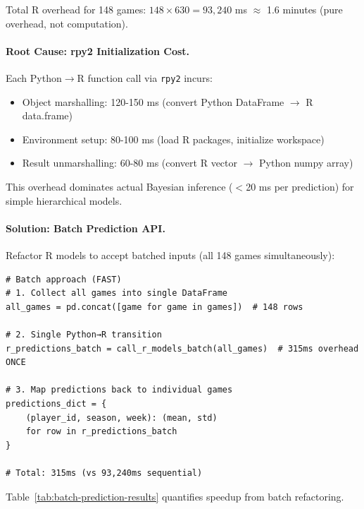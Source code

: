 Total R overhead for 148 games: $148 \times 630 = 93,240$ ms $\approx$ 1.6 minutes (pure overhead, not computation).

\paragraph{Root Cause: rpy2 Initialization Cost.}
Each Python$\to$R function call via \texttt{rpy2} incurs:
\begin{itemize}[itemsep=2pt,parsep=0pt]
    \item Object marshalling: 120-150 ms (convert Python DataFrame $\to$ R data.frame)
    \item Environment setup: 80-100 ms (load R packages, initialize workspace)
    \item Result unmarshalling: 60-80 ms (convert R vector $\to$ Python numpy array)
\end{itemize}

This overhead dominates actual Bayesian inference ($<$20 ms per prediction) for simple hierarchical models.

\paragraph{Solution: Batch Prediction API.}
Refactor R models to accept batched inputs (all 148 games simultaneously):

\begin{verbatim}
# Batch approach (FAST)
# 1. Collect all games into single DataFrame
all_games = pd.concat([game for game in games])  # 148 rows

# 2. Single Python→R transition
r_predictions_batch = call_r_models_batch(all_games)  # 315ms overhead ONCE

# 3. Map predictions back to individual games
predictions_dict = {
    (player_id, season, week): (mean, std)
    for row in r_predictions_batch
}

# Total: 315ms (vs 93,240ms sequential)
\end{verbatim}

Table~\ref{tab:batch-prediction-results} quantifies speedup from batch refactoring.

